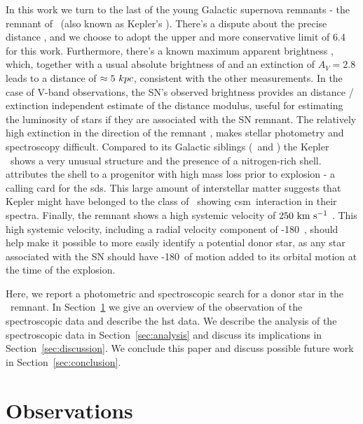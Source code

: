 \documentclass[preprint2]{aastex}
\begin{document}
In this work we turn to the last of the young Galactic supernova remnants - the remnant of \ (also known as Kepler's \sn). There's a dispute about the precise distance \citep[$4-6.4$\,\kpc; see][and references therein]{2012A&A...537A.139C}, and we choose to adopt the upper and more conservative limit of 6.4~\kpc\ \citep{1999AJ....118..926R} for this work. Furthermore, there's a known maximum apparent brightness \citep[V=-3;][]{1971SvA....14..798P}, which, together with a usual absolute brightness of \sneia \citep[$M_V=19.3$;][]{2011ApJ...732..129R} and an extinction of $A_V=2.8$ leads to a distance of $\approx 5~kpc$, consistent with the other measurements. In the case of V-band observations, the SN's observed brightness provides an distance / extinction independent estimate of the distance modulus, useful for estimating the luminosity of stars if they are associated with the SN remnant. The relatively high extinction in the direction of the remnant \citep[$A_V=2.8$, ][]{2007ApJ...668L.135R}, makes stellar photometry and spectroscopy difficult. Compared to its Galactic siblings (\ and ) the Kepler \snr\ shows a very unusual structure and the presence of a nitrogen-rich shell.  \citet{2012A&A...537A.139C} attributes the shell to a progenitor with high mass loss prior to explosion - a calling card for the \gls{sds}. This large amount of interstellar matter suggests that Kepler might have belonged to the class of \sneia\ showing \gls{csm}\ interaction in their spectra. Finally, the remnant shows a high systemic velocity of  $250~\textrm{km}~\textrm{s}^{-1}$ \citep{1991ApJ...366..484B,2003A&A...407..249S}. This high systemic velocity, including a radial velocity component of -180~\kms , should help make it possible to more easily identify a potential donor star, as any star associated with the SN should have -180~\kms of motion added to its orbital motion at the time of the explosion.



Here, we report a photometric and spectroscopic search for a donor star in the \ remnant. In Section~\ref{sec:observations} we give an overview of the observation of the spectroscopic data and describe the \gls{hst} data. We describe the analysis of the spectroscopic data in Section~\ref{sec:analysis} and discuss its implications in Section~\ref{sec:discussion}. We conclude this paper and discuss possible future work in Section~\ref{sec:conclusion}.


\section{Observations}
\label{sec:observations}
\end{document}
